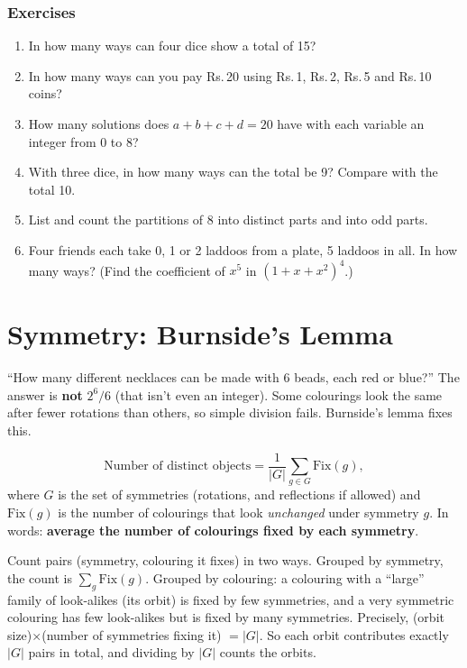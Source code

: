 \documentclass[11pt,a4paper,openany]{report}
\newenvironment{exercises}{\subsection*{Exercises \thechapter}\begin{enumerate}[label=\textbf{\thechapter.\arabic*},leftmargin=3.2em]}{\end{enumerate}}
\newcommand{\Rs}{Rs.\,}
\begin{document}
\begin{exercises}
\item In how many ways can four dice show a total of 15?
\item In how many ways can you pay \Rs20 using \Rs1, \Rs2, \Rs5 and \Rs10 coins?
\item How many solutions does $a+b+c+d=20$ have with each variable an integer from 0 to 8?
\item With three dice, in how many ways can the total be 9? Compare with the total 10.
\item List and count the partitions of 8 into distinct parts and into odd parts.
\item Four friends each take 0, 1 or 2 laddoos from a plate, 5 laddoos in all. In how many ways? (Find the coefficient of $x^5$ in $(1+x+x^2)^4$.)
\end{exercises}

\chapter{Symmetry: Burnside's Lemma}\label{ch:burn}

``How many different necklaces can be made with 6 beads, each red or blue?'' The answer is \textbf{not}
$2^6/6$ (that isn't even an integer). Some colourings look the same after fewer rotations than others, so
simple division fails. Burnside's lemma fixes this.

\begin{idea}
\[\text{Number of distinct objects}=\frac{1}{|G|}\sum_{g\in G}\text{Fix}(g),\]
where $G$ is the set of symmetries (rotations, and reflections if allowed) and $\text{Fix}(g)$ is the number
of colourings that look \emph{unchanged} under symmetry $g$. In words: \textbf{average the number of colourings
fixed by each symmetry}.
\end{idea}

\begin{why}
Count pairs (symmetry, colouring it fixes) in two ways. Grouped by symmetry, the count is $\sum_g\text{Fix}(g)$.
Grouped by colouring: a colouring with a ``large'' family of look-alikes (its orbit) is fixed by few
symmetries, and a very symmetric colouring has few look-alikes but is fixed by many symmetries. Precisely,
(orbit size)$\times$(number of symmetries fixing it) $=|G|$. So each orbit contributes exactly $|G|$ pairs
in total, and dividing by $|G|$ counts the orbits.
\end{why}
\end{document}

